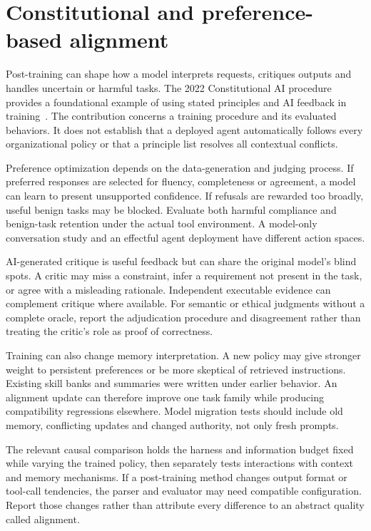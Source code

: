 \section{Constitutional and preference-based alignment}\label{sec:C29:training}
Post-training can shape how a model interprets requests, critiques outputs and handles uncertain or harmful tasks. The 2022 Constitutional AI procedure provides a foundational example of using stated principles and AI feedback in training~\cite{bai2022constitutional}. The contribution concerns a training procedure and its evaluated behaviors. It does not establish that a deployed agent automatically follows every organizational policy or that a principle list resolves all contextual conflicts.

Preference optimization depends on the data-generation and judging process. If preferred responses are selected for fluency, completeness or agreement, a model can learn to present unsupported confidence. If refusals are rewarded too broadly, useful benign tasks may be blocked. Evaluate both harmful compliance and benign-task retention under the actual tool environment. A model-only conversation study and an effectful agent deployment have different action spaces.

AI-generated critique is useful feedback but can share the original model's blind spots. A critic may miss a constraint, infer a requirement not present in the task, or agree with a misleading rationale. Independent executable evidence can complement critique where available. For semantic or ethical judgments without a complete oracle, report the adjudication procedure and disagreement rather than treating the critic's role as proof of correctness.

Training can also change memory interpretation. A new policy may give stronger weight to persistent preferences or be more skeptical of retrieved instructions. Existing skill banks and summaries were written under earlier behavior. An alignment update can therefore improve one task family while producing compatibility regressions elsewhere. Model migration tests should include old memory, conflicting updates and changed authority, not only fresh prompts.

The relevant causal comparison holds the harness and information budget fixed while varying the trained policy, then separately tests interactions with context and memory mechanisms. If a post-training method changes output format or tool-call tendencies, the parser and evaluator may need compatible configuration. Report those changes rather than attribute every difference to an abstract quality called alignment.

